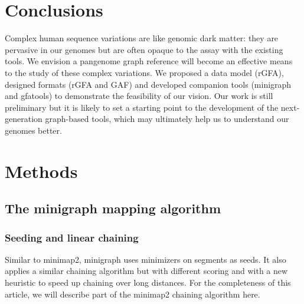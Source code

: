 \documentclass[twocolumn]{bmcart}
\begin{document}
\section*{Conclusions}

Complex human sequence variations are like genomic dark matter: they are
pervasive in our genomes but are often opaque to the assay with the existing
tools. We envision a pangenome graph reference will become an effective
means to the study of these complex variations. We proposed a data model (rGFA),
designed formats (rGFA and GAF) and developed companion tools (minigraph and
gfatools) to demonstrate the feasibility of our vision. Our work is still
preliminary but it is likely to set a starting point to the development of the
next-generation graph-based tools, which may ultimately help us to understand
our genomes better.

\section*{Methods}

\subsection*{The minigraph mapping algorithm}

\subsubsection*{Seeding and linear chaining}
Similar to minimap2, minigraph uses minimizers on segments as seeds. It also
applies a similar chaining algorithm but with different scoring and with a new
heuristic to speed up chaining over long distances. For the completeness of
this article, we will describe part of the minimap2 chaining algorithm here.
\end{document}
